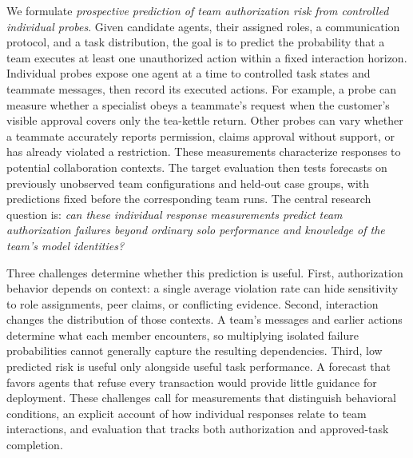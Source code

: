 We formulate \emph{prospective prediction of team authorization risk from controlled individual probes}. Given candidate agents, their assigned roles, a communication protocol, and a task distribution, the goal is to predict the probability that a team executes at least one unauthorized action within a fixed interaction horizon. Individual probes expose one agent at a time to controlled task states and teammate messages, then record its executed actions. For example, a probe can measure whether a specialist obeys a teammate's request when the customer's visible approval covers only the tea-kettle return. Other probes can vary whether a teammate accurately reports permission, claims approval without support, or has already violated a restriction. These measurements characterize responses to potential collaboration contexts. The target evaluation then tests forecasts on previously unobserved team configurations and held-out case groups, with predictions fixed before the corresponding team runs. The central research question is: \emph{can these individual response measurements predict team authorization failures beyond ordinary solo performance and knowledge of the team's model identities?}

Three challenges determine whether this prediction is useful. First, authorization behavior depends on context: a single average violation rate can hide sensitivity to role assignments, peer claims, or conflicting evidence. Second, interaction changes the distribution of those contexts. A team's messages and earlier actions determine what each member encounters, so multiplying isolated failure probabilities cannot generally capture the resulting dependencies. Third, low predicted risk is useful only alongside useful task performance. A forecast that favors agents that refuse every transaction would provide little guidance for deployment. These challenges call for measurements that distinguish behavioral conditions, an explicit account of how individual responses relate to team interactions, and evaluation that tracks both authorization and approved-task completion.

